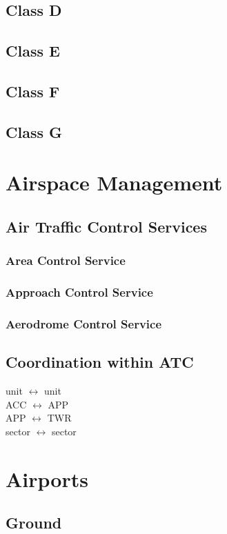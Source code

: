 \subsection{Class D}
\subsection{Class E}
\subsection{Class F}
\subsection{Class G}

\section{Airspace Management}
\subsection{Air Traffic Control Services}
\subsubsection{Area Control Service}
\subsubsection{Approach Control Service}
\subsubsection{Aerodrome Control Service}
\subsection{Coordination within ATC}
unit $\leftrightarrow$ unit \\
ACC $\leftrightarrow$ APP \\
APP $\leftrightarrow$ TWR \\
sector $\leftrightarrow$ sector






\section{Airports}
\subsection{Ground}

